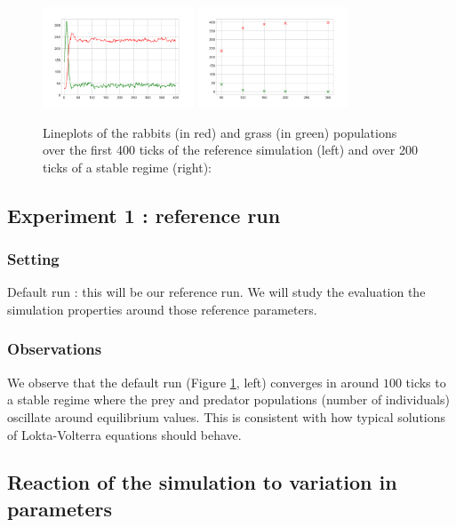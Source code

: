 \documentclass[11pt]{article}
\begin{document}
\begin{figure}[h!]
    \centering
    \includegraphics[width=0.4\textwidth]{plots/sim1.png}
    \includegraphics[width=0.4\textwidth]{plots/ggrate.png}
    \caption{Lineplots of the rabbits (in red) and grass (in green) populations over the first 400 ticks of the reference simulation (left) and over 200 ticks of a stable regime (right):}
    \label{figure}
  \end{figure}

\subsection{Experiment 1 : reference run}

\subsubsection{Setting}

Default run : this will be our reference run. We will study the evaluation the simulation properties around those reference parameters.

\subsubsection{Observations} 

We observe that the default run (Figure \ref{figure}, left) converges in around $100$ ticks to a stable regime where the prey and predator populations (number of individuals) oscillate around equilibrium values. This is consistent with how typical solutions of Lokta-Volterra equations should behave.


\subsection{Reaction of the simulation to variation in parameters}
\end{document}
